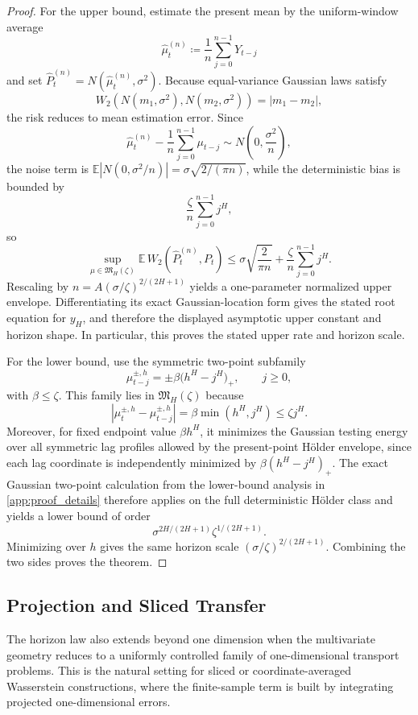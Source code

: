 \begin{proof}
For the upper bound, estimate the present mean by the uniform-window average
\[
  \widehat\mu_t^{(n)}\coloneqq \frac{1}{n}\sum_{j=0}^{n-1}Y_{t-j}
\]
and set $\widehat P_t^{(n)}=N(\widehat\mu_t^{(n)},\sigma^2)$. Because equal-variance
Gaussian laws satisfy
\[
  W_2\!\left(N(m_1,\sigma^2),N(m_2,\sigma^2)\right)=|m_1-m_2|,
\]
the risk reduces to mean estimation error. Since
\[
  \widehat\mu_t^{(n)}-\frac{1}{n}\sum_{j=0}^{n-1}\mu_{t-j}
  \sim N\!\left(0,\frac{\sigma^2}{n}\right),
\]
the noise term is
$\mathbb E|N(0,\sigma^2/n)|=\sigma\sqrt{2/(\pi n)}$, while the deterministic bias is bounded by
\[
  \frac{\zeta}{n}\sum_{j=0}^{n-1} j^H,
\]
so
\[
  \sup_{\mu\in\mathfrak M_H(\zeta)}
  \mathbb E\,W_2\!\left(\widehat P_t^{(n)},P_t\right)
  \le
  \sigma\sqrt{\frac{2}{\pi n}} + \frac{\zeta}{n}\sum_{j=0}^{n-1} j^H.
\]
Rescaling by $n=A(\sigma/\zeta)^{2/(2H+1)}$ yields a one-parameter normalized
upper envelope. Differentiating its exact Gaussian-location form gives the stated
root equation for $y_H$, and therefore the displayed asymptotic upper constant
and horizon shape. In particular, this proves the stated upper rate and horizon
scale.

For the lower bound, use the symmetric two-point subfamily
\[
  \mu_{t-j}^{\pm,h}=\pm \beta\bigl(h^H-j^H\bigr)_+,
  \qquad j\ge 0,
\]
with $\beta\le \zeta$. This family lies in $\mathfrak M_H(\zeta)$ because
\[
  |\mu_t^{\pm,h}-\mu_{t-j}^{\pm,h}|=\beta\min(h^H,j^H)\le \zeta j^H.
\]
Moreover, for fixed endpoint value $\beta h^H$, it minimizes the Gaussian testing
energy over all symmetric lag profiles allowed by the present-point H\"older
envelope, since each lag coordinate is independently minimized by
$\beta(h^H-j^H)_+$. The exact Gaussian two-point calculation from the lower-bound
analysis in \cref{app:proof_details} therefore applies on the full deterministic H\"older class and
yields a lower bound of order
\[
  \sigma^{2H/(2H+1)}\zeta^{1/(2H+1)}.
\]
Minimizing over $h$ gives the same horizon scale $(\sigma/\zeta)^{2/(2H+1)}$.
Combining the two sides proves the theorem.
\end{proof}

\subsection{Projection and Sliced Transfer}

The horizon law also extends beyond one dimension when the multivariate geometry
reduces to a uniformly controlled family of one-dimensional transport problems.
This is the natural setting for sliced or coordinate-averaged Wasserstein
constructions, where the finite-sample term is built by integrating projected
one-dimensional errors.

